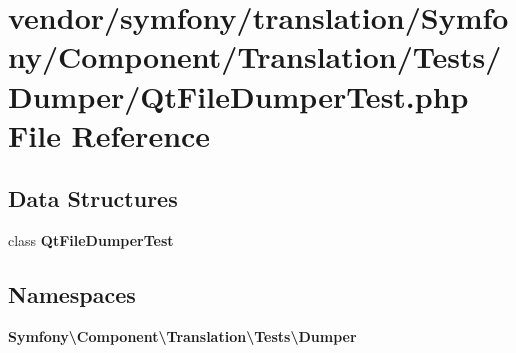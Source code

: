 \section{vendor/symfony/translation/\+Symfony/\+Component/\+Translation/\+Tests/\+Dumper/\+Qt\+File\+Dumper\+Test.php File Reference}
\label{_qt_file_dumper_test_8php}
\subsection*{Data Structures}
\begin{DoxyCompactItemize}
\item 
class {\bf Qt\+File\+Dumper\+Test}
\end{DoxyCompactItemize}
\subsection*{Namespaces}
\begin{DoxyCompactItemize}
\item 
 {\bf Symfony\textbackslash{}\+Component\textbackslash{}\+Translation\textbackslash{}\+Tests\textbackslash{}\+Dumper}
\end{DoxyCompactItemize}
